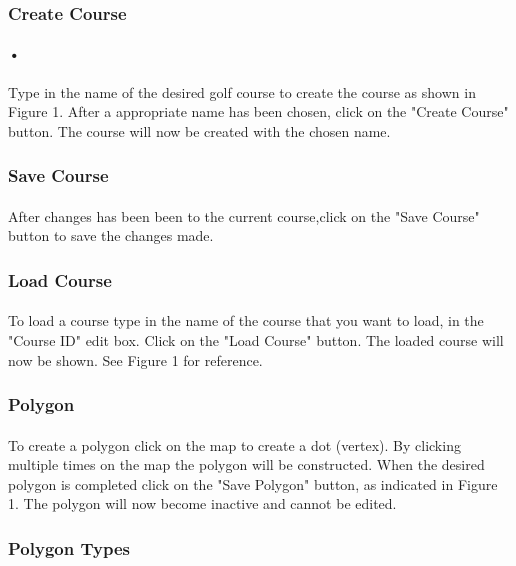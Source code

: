 \documentclass{article}
\begin{document}
    \subsubsection{Create Course}
    \paragraph{•}
    Type in the name of the desired golf course to create the course as shown in Figure 1. After a appropriate name has been chosen, click on the "Create Course" button. The course will now be created with the chosen name.
    
    \subsubsection{Save Course} 
    \paragraph{}
    After changes has been been to the current course,click on the "Save Course" button to save the changes made.
    
    
    \subsubsection{Load Course}
    \paragraph{}
    To load a course type in the name of the course that you want to load, in the "Course ID" edit box. Click on the "Load Course" button. The loaded course will now be shown. See Figure 1 for reference.
    
    \subsubsection{Polygon}
    
    \paragraph{}
    To create a polygon click on the map to create a dot (vertex). By clicking multiple times on the map the polygon will be constructed. When the desired polygon is completed click on the "Save Polygon" button, as indicated in Figure 1. The polygon will now become inactive and cannot be edited.
    
    \subsubsection{Polygon Types}
\end{document}

